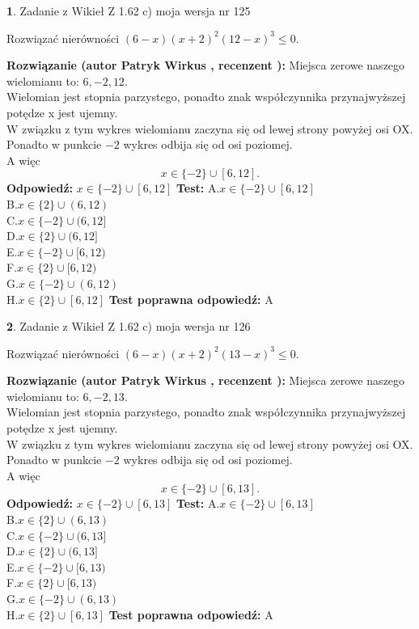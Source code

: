 \documentclass[12pt, a4paper]{article}
\theoremstyle{definition} %
\newtheorem{zad}{}
\newcommand{\zadStart}[1]{\begin{zad}#1\newline}
\newcommand{\zadStop}{\end{zad}}
\newcommand{\rozwStart}[2]{\noindent \textbf{Rozwiązanie (autor #1 , recenzent #2): }\newline}
\newcommand{\rozwStop}{\newline}
\newcommand{\odpStart}{\noindent \textbf{Odpowiedź:}\newline}
\newcommand{\odpStop}{\newline}
\newcommand{\testStart}{\noindent \textbf{Test:}\newline}
\newcommand{\testStop}{\newline}
\newcommand{\kluczStart}{\noindent \textbf{Test poprawna odpowiedź:}\newline}
\newcommand{\kluczStop}{\newline}
\begin{document}
\zadStart{Zadanie z Wikieł Z 1.62 c) moja wersja nr 125}

Rozwiązać nierówności $(6-x)(x+2)^{2}(12-x)^{3}\le0$.
\zadStop
\rozwStart{Patryk Wirkus}{}
Miejsca zerowe naszego wielomianu to: $6, -2, 12$.\\
Wielomian jest stopnia parzystego, ponadto znak współczynnika przy\linebreak najwyższej potędze x jest ujemny.\\ W związku z tym wykres wielomianu zaczyna się od lewej strony powyżej osi OX.\\
Ponadto w punkcie $-2$ wykres odbija się od osi poziomej.\\
A więc $$x \in \{-2\} \cup [6,12].$$
\rozwStop
\odpStart
$x \in \{-2\} \cup [6,12]$
\odpStop
\testStart
A.$x \in \{-2\} \cup [6,12]$\\
B.$x \in \{2\} \cup (6,12)$\\
C.$x \in \{-2\} \cup (6,12]$\\
D.$x \in \{2\} \cup (6,12]$\\
E.$x \in \{-2\} \cup [6,12)$\\
F.$x \in \{2\} \cup [6,12)$\\
G.$x \in \{-2\} \cup (6,12)$\\
H.$x \in \{2\} \cup [6,12]$
\testStop
\kluczStart
A
\kluczStop



\zadStart{Zadanie z Wikieł Z 1.62 c) moja wersja nr 126}

Rozwiązać nierówności $(6-x)(x+2)^{2}(13-x)^{3}\le0$.
\zadStop
\rozwStart{Patryk Wirkus}{}
Miejsca zerowe naszego wielomianu to: $6, -2, 13$.\\
Wielomian jest stopnia parzystego, ponadto znak współczynnika przy\linebreak najwyższej potędze x jest ujemny.\\ W związku z tym wykres wielomianu zaczyna się od lewej strony powyżej osi OX.\\
Ponadto w punkcie $-2$ wykres odbija się od osi poziomej.\\
A więc $$x \in \{-2\} \cup [6,13].$$
\rozwStop
\odpStart
$x \in \{-2\} \cup [6,13]$
\odpStop
\testStart
A.$x \in \{-2\} \cup [6,13]$\\
B.$x \in \{2\} \cup (6,13)$\\
C.$x \in \{-2\} \cup (6,13]$\\
D.$x \in \{2\} \cup (6,13]$\\
E.$x \in \{-2\} \cup [6,13)$\\
F.$x \in \{2\} \cup [6,13)$\\
G.$x \in \{-2\} \cup (6,13)$\\
H.$x \in \{2\} \cup [6,13]$
\testStop
\kluczStart
A
\kluczStop
\end{document}
